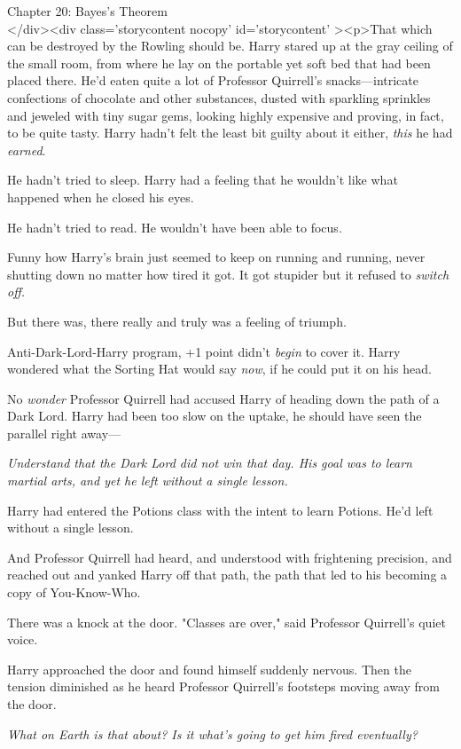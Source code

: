 
Chapter 20: Bayes's Theorem\\
</div><div  class='storycontent nocopy' id='storycontent' ><p>That which can be destroyed by the Rowling should be.
\sbreak
Harry stared up at the gray ceiling of the small room, from where he lay on the portable yet soft bed that had been placed there. He'd eaten quite a lot of Professor Quirrell's snacks---intricate confections of chocolate and other substances, dusted with sparkling sprinkles and jeweled with tiny sugar gems, looking highly expensive and proving, in fact, to be quite tasty. Harry hadn't felt the least bit guilty about it either, \emph{this} he had \emph{earned}.

He hadn't tried to sleep. Harry had a feeling that he wouldn't like what happened when he closed his eyes.

He hadn't tried to read. He wouldn't have been able to focus.

Funny how Harry's brain just seemed to keep on running and running, never shutting down no matter how tired it got. It got stupider but it refused to \emph{switch off.}

But there was, there really and truly was a feeling of triumph.

Anti-Dark-Lord-Harry program, +1 point didn't \emph{begin} to cover it. Harry wondered what the Sorting Hat would say \emph{now}, if he could put it on his head.

No \emph{wonder} Professor Quirrell had accused Harry of heading down the path of a Dark Lord. Harry had been too slow on the uptake, he should have seen the parallel right away---

\emph{Understand that the Dark Lord did not win that day. His goal was to learn martial arts, and yet he left without a single lesson.}

Harry had entered the Potions class with the intent to learn Potions. He'd left without a single lesson.

And Professor Quirrell had heard, and understood with frightening precision, and reached out and yanked Harry off that path, the path that led to his becoming a copy of You-Know-Who.

There was a knock at the door. "Classes are over," said Professor Quirrell's quiet voice.

Harry approached the door and found himself suddenly nervous. Then the tension diminished as he heard Professor Quirrell's footsteps moving away from the door.

\emph{What on Earth is that about? Is it what's going to get him fired eventually?}

